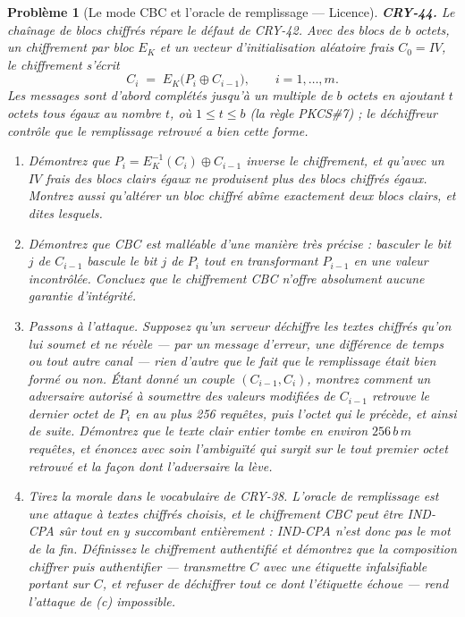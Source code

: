 \documentclass[11pt]{article}
\newtheorem{problem}{Problème}
\begin{document}
\begin{problem}[{Le mode CBC et l'oracle de remplissage --- Licence}]
\textbf{CRY-44.} Le chaînage de blocs chiffrés répare le défaut de CRY-42. Avec des blocs
de $b$ octets, un chiffrement par bloc $E_K$ et un vecteur d'initialisation aléatoire
frais $C_0 = IV$, le chiffrement s'écrit
\[ C_i \;=\; E_K\bigl(P_i \oplus C_{i-1}\bigr), \qquad i = 1, \dots, m . \]
Les messages sont d'abord complétés jusqu'à un multiple de $b$ octets en ajoutant $t$
octets tous égaux au nombre $t$, où $1 \le t \le b$ (la règle PKCS\#7) ; le déchiffreur
contrôle que le remplissage retrouvé a bien cette forme.
\begin{enumerate}
\item[(a)] Démontrez que $P_i = E_K^{-1}(C_i) \oplus C_{i-1}$ inverse le chiffrement, et qu'avec un
$IV$ frais des blocs clairs égaux ne produisent plus des blocs chiffrés égaux. Montrez aussi
qu'altérer un bloc chiffré abîme exactement deux blocs clairs, et dites lesquels.
\item[(b)] Démontrez que CBC est malléable d'une manière très précise : basculer le bit $j$ de
$C_{i-1}$ bascule le bit $j$ de $P_i$ tout en transformant $P_{i-1}$ en une valeur
incontrôlée. Concluez que le chiffrement CBC n'offre absolument aucune garantie
d'intégrité.
\item[(c)] Passons à l'attaque. Supposez qu'un serveur déchiffre les textes chiffrés qu'on lui
soumet et ne révèle --- par un message d'erreur, une différence de temps ou tout autre canal ---
rien d'autre que le fait que le remplissage était bien formé ou non. Étant donné un couple
$(C_{i-1}, C_i)$, montrez comment un adversaire autorisé à soumettre des valeurs modifiées
de $C_{i-1}$ retrouve le dernier octet de $P_i$ en au plus 256 requêtes, puis l'octet qui
le précède, et ainsi de suite. Démontrez que le texte clair entier tombe en environ
$256\,b\,m$ requêtes, et énoncez avec soin l'ambiguïté qui surgit sur le tout premier octet
retrouvé et la façon dont l'adversaire la lève.
\item[(d)] Tirez la morale dans le vocabulaire de CRY-38. L'oracle de remplissage est une attaque à
textes chiffrés choisis, et le chiffrement CBC peut être IND-CPA sûr tout en y succombant
entièrement : IND-CPA n'est donc pas le mot de la fin. Définissez le chiffrement authentifié
et démontrez que la composition \og{} chiffrer puis authentifier \fg{} --- transmettre $C$ avec une
étiquette infalsifiable portant sur $C$, et refuser de déchiffrer tout ce dont l'étiquette
échoue --- rend l'attaque de (c) impossible.
\end{enumerate}

\end{problem}
\end{document}
